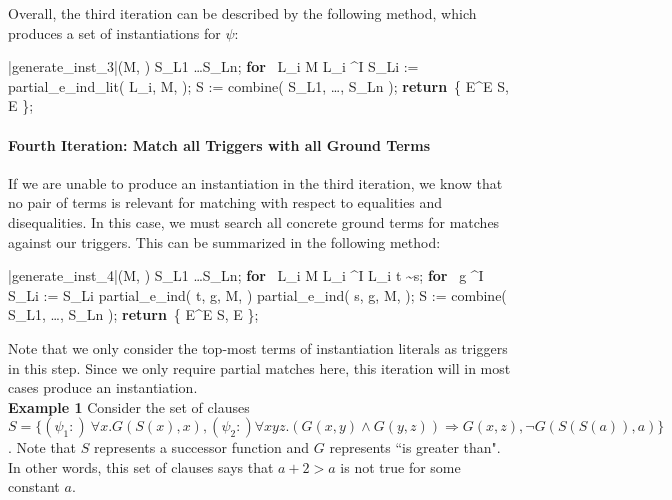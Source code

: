\documentclass{llncs}
\def\RETURN{\keyword{return}\ }
\def\ENDPROC{\untab}
\def\DOFOR{\qtab\keyword{for}\ }
\def\ENDFOR{\untab}
\def\keyword#1{\mbox{\normalshape\bf #1}}
\begin{document}
Overall, the third iteration can be described by the following method, which produces a set of instantiations for $\psi$:

\begin{minipage}[t]{.4\linewidth}
\begin{program}
\PROC |generate\_inst_3|(M, \psi) \BODY
S_{L1} \ldots S_{Ln};
\DOFOR {} L_i \in M  L_i \mapsto^I \psi
  S_{Li} := partial\_e\_ind\_lit( L_i, M, \psi );
\ENDFOR
S := combine( S_{L1}, \ldots, S_{Ln} );
\RETURN \{ E^\varepsilon \mid E \in S, E  \};
\ENDPROC
\end{program}
\end{minipage}

\paragraph{Fourth Iteration: Match all Triggers with all Ground Terms}

If we are unable to produce an instantiation in the third iteration, we know that no pair of terms is relevant for matching with respect to equalities and disequalities.
In this case, we must search all concrete ground terms for matches against our triggers.
This can be summarized in the following method:

\begin{minipage}[t]{.4\linewidth}
\begin{program}
\PROC |generate\_inst_4|(M, \psi) \BODY
S_{L1} \ldots S_{Ln};
\DOFOR {} L_i \in M  L_i \mapsto^I \psi
  L_i  t \sim s;
  \DOFOR {} g \mapsto^I \emptyset
    S_{Li} := S_{Li} \cup partial\_e\_ind( t, g, M, \psi ) \cup partial\_e\_ind( s, g, M, \psi );
  \ENDFOR
\ENDFOR
S := combine( S_{L1}, \ldots, S_{Ln} );
\RETURN \{ E^\varepsilon \mid E \in S, E  \};
\ENDPROC
\end{program}
\end{minipage}

Note that we only consider the top-most terms of instantiation literals as triggers in this step.
Since we only require partial matches here, this iteration will in most cases produce an instantiation. \\

{\bf Example 1}
Consider the set of clauses $S = \{ (\psi_1 :) \ \forall x. G( S( x ), x), (\psi_2 :) \forall xyz. (G(x,y) \wedge G(y,z)) \Rightarrow G(x,z), \neg G( S(S(a)), a) \}$.
Note that $S$ represents a successor function and $G$ represents ``is greater than".  
In other words, this set of clauses says that $a + 2 > a$ is not true for some constant $a$.
\end{document}
